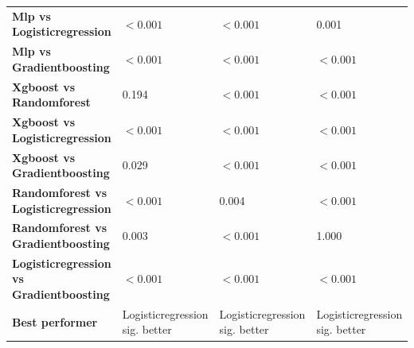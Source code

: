 \begin{table}[H]
{\begin{tabular}{llll}
        \textbf{Mlp vs Logisticregression} & $< 0.001$ & $< 0.001$ & 0.001 \\
        \textbf{Mlp vs Gradientboosting} & $< 0.001$ & $< 0.001$ & $< 0.001$ \\
        \textbf{Xgboost vs Randomforest} & 0.194 & $< 0.001$ & $< 0.001$ \\
        \textbf{Xgboost vs Logisticregression} & $< 0.001$ & $< 0.001$ & $< 0.001$ \\
        \textbf{Xgboost vs Gradientboosting} & 0.029 & $< 0.001$ & $< 0.001$ \\
        \textbf{Randomforest vs Logisticregression} & $< 0.001$ & 0.004 & $< 0.001$ \\
        \textbf{Randomforest vs Gradientboosting} & 0.003 & $< 0.001$ & 1.000 \\
        \textbf{Logisticregression vs Gradientboosting} & $< 0.001$ & $< 0.001$ & $< 0.001$ \\
        \textbf{Best performer} & Logisticregression sig. better & Logisticregression sig. better & Logisticregression sig. better \\
        \bottomrule
    \end{tabular}}
\end{table}